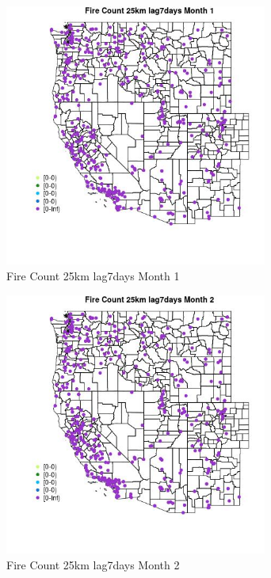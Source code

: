 \begin{figure} 
\centering  
\includegraphics[width=0.77\textwidth]{Code_Outputs/Report_ML_input_PM25_Step4_part_e_de_duplicated_aves_compiled_2019-05-18wNAs_MapObsMo1Fire_Count_25km_lag7days.jpg} 
\caption{\label{fig:Report_ML_input_PM25_Step4_part_e_de_duplicated_aves_compiled_2019-05-18wNAsMapObsMo1Fire_Count_25km_lag7days}Fire Count 25km lag7days Month 1} 
\end{figure} 
 

\begin{figure} 
\centering  
\includegraphics[width=0.77\textwidth]{Code_Outputs/Report_ML_input_PM25_Step4_part_e_de_duplicated_aves_compiled_2019-05-18wNAs_MapObsMo2Fire_Count_25km_lag7days.jpg} 
\caption{\label{fig:Report_ML_input_PM25_Step4_part_e_de_duplicated_aves_compiled_2019-05-18wNAsMapObsMo2Fire_Count_25km_lag7days}Fire Count 25km lag7days Month 2} 
\end{figure} 
 

